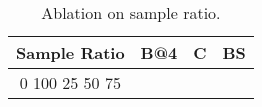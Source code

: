 \begin{table}[t]
\centering
\small
\caption{Ablation on sample ratio.}
\label{tab:mask_sample_ratio}
\begin{tabular}{crrr}
\toprule
Sample Ratio & B@4 & C & BS \\
\midrule
0%
100%
25%
50%
75%
\bottomrule
\end{tabular}
\end{table}
